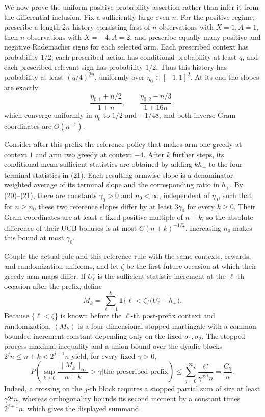 We now prove the uniform positive-probability assertion rather than infer it from the differential inclusion.  Fix a sufficiently large even \(n\).  For the positive regime, prescribe a length-\(2n\) history consisting first of \(n\) observations with \(X=1,A=1\), then \(n\) observations with \(X=-4,A=2\), and prescribe equally many positive and negative Rademacher signs for each selected arm.  Each prescribed context has probability \(1/2\), each prescribed action has conditional probability at least \(q\), and each prescribed relevant sign has probability \(1/2\).  Thus this history has probability at least \((q/4)^{2n}\), uniformly over \(\eta_0\in[-1,1]^2\).  At its end the slopes are exactly
\[
 \frac{\eta_{0,1}+n/2}{1+n},\qquad
 \frac{\eta_{0,2}-n/3}{1+16n}, \tag{21}
\]
which converge uniformly in \(\eta_0\) to \(1/2\) and \(-1/48\), and both inverse Gram coordinates are \(O(n^{-1})\).

Consider after this prefix the reference policy that makes arm one greedy at context \(1\) and arm two greedy at context \(-4\).  After \(k\) further steps, its conditional-mean sufficient statistics are obtained by adding \(kh_+\) to the four terminal statistics in (21).  Each resulting armwise slope is a denominator-weighted average of its terminal slope and the corresponding ratio in \(h_+\).  By (20)--(21), there are constants \(\gamma_0>0\) and \(n_0<\infty\), independent of \(\eta_0\), such that for \(n\geq n_0\) these two reference slopes differ by at least \(3\gamma_0\) for every \(k\geq0\).  Their Gram coordinates are at least a fixed positive multiple of \(n+k\), so the absolute difference of their UCB bonuses is at most \(C(n+k)^{-1/2}\).  Increasing \(n_0\) makes this bound at most \(\gamma_0\).

Couple the actual rule and this reference rule with the same contexts, rewards, and randomization uniforms, and let \(\zeta\) be the first future occasion at which their greedy-arm maps differ.  If \(U^{\circ}_\ell\) is the sufficient-statistic increment at the \(\ell\)-th occasion after the prefix, define
\[
 M_k=\sum_{\ell=1}^k\mathbf 1\{\ell<\zeta\}\bigl(U^{\circ}_\ell-h_+\bigr).
\]
Because \(\{\ell<\zeta\}\) is known before the \(\ell\)-th post-prefix context and randomization, \((M_k)\) is a four-dimensional stopped martingale with a common bounded-increment constant depending only on the fixed \(\sigma_1,\sigma_2\).  The stopped-process maximal inequality and a union bound over the dyadic blocks \(2^jn\leq n+k<2^{j+1}n\) yield, for every fixed \(\gamma>0\),
\[
 P\left(\sup_{k\geq0}\frac{\|M_k\|_\infty}{n+k}>\gamma
 \mathrel{\Big|}\text{the prescribed prefix}\right)
 \leq \sum_{j=0}^{\infty}\frac{C}{\gamma^22^jn}
 =\frac{C_\gamma}{n}. \tag{22}
\]
Indeed, a crossing on the \(j\)-th block requires a stopped partial sum of size at least \(\gamma2^jn\), whereas orthogonality bounds its second moment by a constant times \(2^{j+1}n\), which gives the displayed summand.

